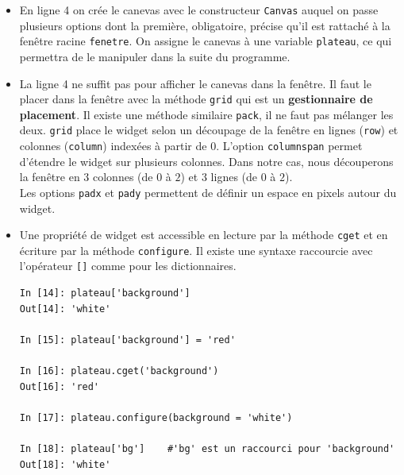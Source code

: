 \documentclass[a4paper, french, 12pt]{article}  %
\newcounter{prop}
\begin{document}
\begin{itemize}[label=]

	\item En ligne 4 on crée le canevas avec le constructeur \lstinline+Canvas+ auquel on passe plusieurs options dont la première, obligatoire, précise qu'il est rattaché à la fenêtre racine \lstinline+fenetre+. On assigne le canevas à une variable \lstinline+plateau+, ce qui permettra de le manipuler   dans la suite du programme.

    \item La ligne 4 ne suffit pas pour afficher le canevas dans la fenêtre. Il faut le placer dans la fenêtre avec la méthode \lstinline+grid+ qui est un \textbf{gestionnaire de placement}. Il existe une méthode similaire  \lstinline+pack+, il ne faut pas mélanger les deux.  \lstinline+grid+  place le widget selon un découpage de la fenêtre en lignes (\lstinline+row+) et colonnes (\lstinline+column+) indexées à partir de $0$.  L'option \lstinline+columnspan+ permet d'étendre le widget sur plusieurs colonnes. Dans notre cas, nous découperons la fenêtre en $3$ colonnes (de $0$ à $2$) et $3$ lignes (de $0$ à $2$).\\    
Les options \lstinline+padx+ et \lstinline+pady+ permettent de définir un espace en pixels autour du widget.


\item Une propriété de widget est accessible en lecture  par la méthode \lstinline+cget+ et en écriture par la méthode \lstinline+configure+. Il existe une syntaxe raccourcie avec l'opérateur \lstinline+[]+ comme pour les dictionnaires.

\begin{lstlisting}
In [14]: plateau['background']
Out[14]: 'white'

In [15]: plateau['background'] = 'red'

In [16]: plateau.cget('background')
Out[16]: 'red'

In [17]: plateau.configure(background = 'white')

In [18]: plateau['bg']    #'bg' est un raccourci pour 'background'
Out[18]: 'white'
\end{lstlisting}

\end{itemize}
\end{document}
